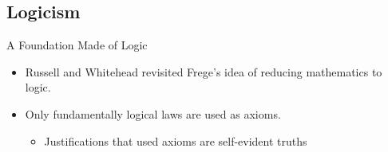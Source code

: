 \documentclass{beamer}
\begin{document}
\subsection{Logicism}
\begin{frame}{A Foundation Made of Logic}
    \begin{itemize}
	\item<1-> Russell and Whitehead revisited Frege's idea of reducing mathematics to logic.	
	\item<3-> Only fundamentally logical laws are used as axioms.
	\begin{itemize}
		\item<4-> Justifications that used axioms are self-evident truths
	\end{itemize}
    \end{itemize}
\end{frame}
\end{document}
